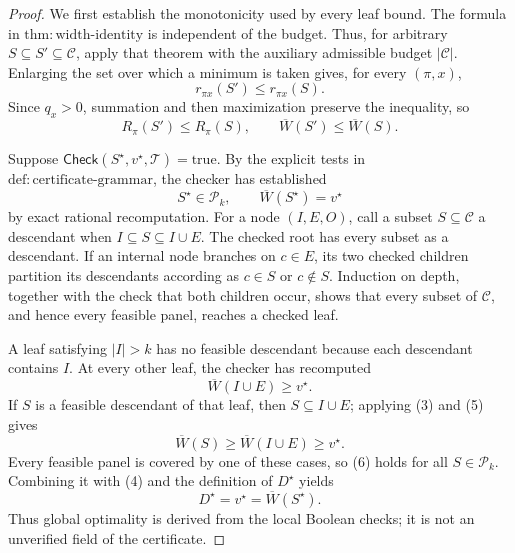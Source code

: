 \documentclass{article}
\begin{document}
\begin{proof}
We first establish the monotonicity used by every leaf bound.  The formula
in \(\mathrm{thm{:}width\text{-}identity}\) is independent of the budget.
Thus, for arbitrary \(S\subseteq S'\subseteq\mathcal C\), apply that theorem
with the auxiliary admissible budget \(|\mathcal C|\).  Enlarging the set
over which a minimum is taken gives, for every \((\pi,x)\),
\[
r_{\pi x}(S')\leq r_{\pi x}(S).
\]
Since \(q_x>0\), summation and then maximization preserve the inequality, so
\[
R_\pi(S')\leq R_\pi(S),
\qquad
\overline W(S')\leq\overline W(S).                                    \tag{3}
\]

Suppose \(\mathsf{Check}(S^\star,v^\star,\mathcal T)=\mathrm{true}\).
By the explicit tests in \(\mathrm{def{:}certificate\text{-}grammar}\),
the checker has established
\[
S^\star\in\mathcal P_k,
\qquad
\overline W(S^\star)=v^\star                                      \tag{4}
\]
by exact rational recomputation.  For a node \((I,E,O)\), call a subset
\(S\subseteq\mathcal C\) a descendant when
\(I\subseteq S\subseteq I\cup E\).  The checked root has every subset as a
descendant.  If an internal node branches on \(c\in E\), its two checked
children partition its descendants according as \(c\in S\) or
\(c\notin S\).  Induction on depth, together with the check that both
children occur, shows that every subset of \(\mathcal C\), and hence every
feasible panel, reaches a checked leaf.

A leaf satisfying \(|I|>k\) has no feasible descendant because each
descendant contains \(I\).  At every other leaf, the checker has recomputed
\[
\overline W(I\cup E)\geq v^\star.                                     \tag{5}
\]
If \(S\) is a feasible descendant of that leaf, then
\(S\subseteq I\cup E\); applying (3) and (5) gives
\[
\overline W(S)\geq\overline W(I\cup E)\geq v^\star.                   \tag{6}
\]
Every feasible panel is covered by one of these cases, so (6) holds for
all \(S\in\mathcal P_k\).  Combining it with (4) and the definition of
\(D^\star\) yields
\[
D^\star=v^\star=\overline W(S^\star).
\]
Thus global optimality is derived from the local Boolean checks; it is not
an unverified field of the certificate.


\end{proof}
\end{document}
